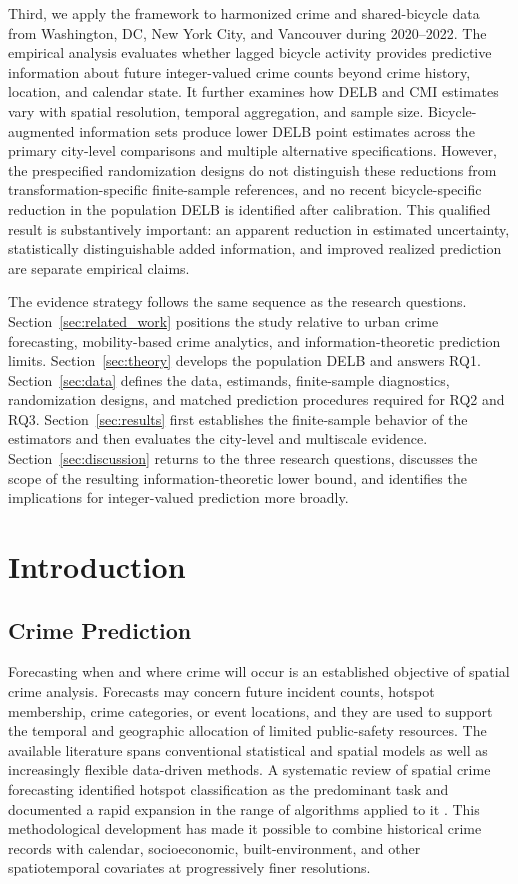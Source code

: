 \documentclass[applsci,article,submit,moreauthors]{Definitions/mdpi}
\begin{document}
Third, we apply the framework to harmonized crime and shared-bicycle data
from Washington, DC, New York City, and Vancouver during 2020--2022.
The empirical analysis evaluates whether lagged bicycle activity provides
predictive information about future integer-valued crime counts beyond
crime history, location, and calendar state. It further examines how DELB
and CMI estimates vary with spatial resolution, temporal aggregation, and
sample size. Bicycle-augmented information sets produce lower DELB point
estimates across the primary city-level comparisons and multiple alternative
specifications. However, the prespecified randomization designs do not
distinguish these reductions from transformation-specific finite-sample
references, and no recent bicycle-specific reduction in the population
DELB is identified after calibration. This qualified
result is substantively important: an apparent reduction in estimated
uncertainty, statistically distinguishable added information, and improved
realized prediction are separate empirical claims.

The evidence strategy follows the same sequence as the research questions.
Section~\ref{sec:related_work} positions the study relative to urban crime
forecasting, mobility-based crime analytics, and information-theoretic
prediction limits. Section~\ref{sec:theory} develops the population DELB
and answers RQ1. Section~\ref{sec:data} defines the data, estimands,
finite-sample diagnostics, randomization designs, and matched prediction
procedures required for RQ2 and RQ3. Section~\ref{sec:results}
first establishes the finite-sample behavior of the estimators and then
evaluates the city-level and multiscale evidence.
Section~\ref{sec:discussion} returns to the three research questions,
discusses the scope of the resulting information-theoretic lower bound, and identifies
the implications for integer-valued prediction more broadly.
\fi

\iffalse
\section{Introduction}
\label{sec:introduction}

\subsection{Crime Prediction}
\label{subsec:intro_crime_prediction}

Forecasting when and where crime will occur is an established objective of
spatial crime analysis. Forecasts may concern future incident counts,
hotspot membership, crime categories, or event locations, and they are used
to support the temporal and geographic allocation of limited public-safety
resources. The available literature spans conventional statistical and
spatial models as well as increasingly flexible data-driven methods. A
systematic review of spatial crime forecasting identified hotspot
classification as the predominant task and documented a rapid expansion in
the range of algorithms applied to it \citep{kounadi2020review}. This
methodological development has made it possible to combine historical crime
records with calendar, socioeconomic, built-environment, and other
spatiotemporal covariates at progressively finer resolutions.
\end{document}
